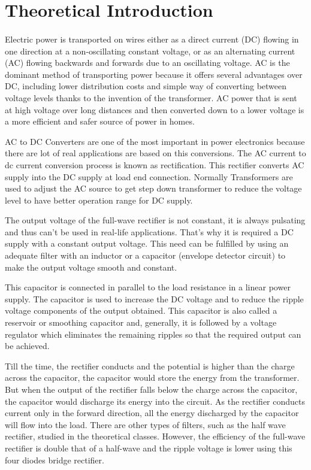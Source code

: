 \section{Theoretical Introduction}
\label{sec:theoretical}

\paragraph{}
Electric power is transported on wires either as a direct current (DC) flowing in one direction at a non-oscillating constant voltage, or as an alternating current (AC) flowing backwards and forwards due to an oscillating voltage. AC is the dominant method of transporting power because it offers several advantages over DC, including lower distribution costs and simple way of converting between voltage levels thanks to the invention of the transformer. AC power that is sent at high voltage over long distances and then converted down to a lower voltage is a more efficient and safer source of power in homes. 

AC to DC Converters are one of the most important in power electronics because there are lot of real applications are based on this conversions. The AC current to dc current conversion process is known as rectification. This rectifier converts AC supply into the DC supply at load end connection. Normally Transformers are used to adjust the AC source to get step down transformer to reduce the voltage level to have better operation range for DC supply.

The output voltage of the full-wave rectifier is not constant, it is always pulsating and thus can’t be used in real-life applications. That's why it is required a DC supply with a constant output voltage. This need can be fulfilled by using an adequate filter with an inductor or a capacitor (envelope detector circuit) to make the output voltage smooth and constant.

This capacitor is connected in parallel to the load resistance in a linear power supply. The capacitor is used to increase the DC voltage and to reduce the ripple voltage components of the output obtained. This capacitor is also called a reservoir or smoothing capacitor and, generally, it is followed by a voltage regulator which eliminates the remaining ripples so that the required output can be achieved.

Till the time, the rectifier conducts and the potential is higher than the charge across the capacitor, the capacitor would store the energy from the transformer. But when the output of the rectifier falls below the charge across the capacitor, the capacitor would discharge its energy into the circuit. As the rectifier conducts current only in the forward direction, all the energy discharged by the capacitor will flow into the load. There are other types of filters, such as the half wave rectifier, studied in the theoretical classes. However, the efficiency of the full-wave rectifier is double that of a half-wave and the ripple voltage is lower using this four diodes bridge rectifier.

